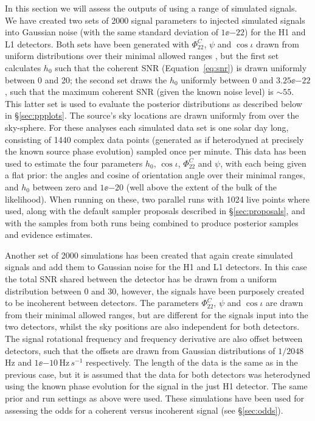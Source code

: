 In this section we will assess the outputs of \lppen using a range of simulated signals. We have created two sets of 2000 signal parameters to
injected simulated signals into Gaussian noise (with the same standard deviation of $1\ee{-22}$) for the H1 and L1 detectors. Both sets have been generated
with $\Phi_{22}^C$, $\psi$ and $\cos{\iota}$ drawn from uniform distributions over their minimal allowed ranges \citep[Table~1 of][]{2015MNRAS.453.4399P},
but the first set
calculates $h_0$ such that the coherent SNR (Equation~\ref{eq:snr}) is drawn uniformly between 0 and 20; the second set draws the $h_0$ uniformly between
0 and $3.25\ee{-22}$, such that the maximum coherent SNR (given the known noise level) is $\sim 55$. This latter set is used to evaluate the posterior
distributions as described below in \S\ref{sec:ppplots}. The source's sky locations are drawn uniformly from over the sky-sphere. For these analyses each
simulated data set is one solar day long, consisting of 1440 complex data points (generated as if heterodyned at precisely the known source phase evolution)
sampled once per minute. This data has been used to estimate the four parameters $h_0$, $\cos{\iota}$, $\Phi_{22}^C$ and $\psi$, with each being given
a flat prior: the angles and cosine of orientation angle over their minimal ranges, and $h_0$ between zero and $1\ee{-20}$ (well above the extent of the
bulk of the likelihood). When running \lppen on these, two parallel runs with 1024 live points where used, along with the default sampler proposals described
in \S\ref{sec:proposals}, and with the samples from both runs being combined to produce posterior samples and evidence estimates.

Another set of 2000 simulations has been created that again create simulated signals and add them to Gaussian noise for the H1 and L1 detectors. In this
case the total SNR shared between the detector has be drawn from a uniform distribution between 0 and 30, however, the signals have been purposely created
to be incoherent between detectors. The parameters $\Phi_{22}^C$, $\psi$ and $\cos{\iota}$ are drawn from their minimal allowed ranges, but are different for
the signals input into the two detectors, whilst the sky positions are also independent for both detectors. The signal rotational frequency and frequency
derivative are also offset between detectors, such that the offsets are drawn from Gaussian distributions of $1/2048$\,Hz and $1\ee{-10}$\,Hz$\,s^{-1}$
respectively. The length of the data is the same as in the previous case, but it is assumed that the data for both detectors was heterodyned using the
known phase evolution for the signal in the just H1 detector. The same prior and run settings as above were used. These simulations have been used for
assessing the odds for a coherent versus incoherent signal (see \S\ref{sec:odds}).

